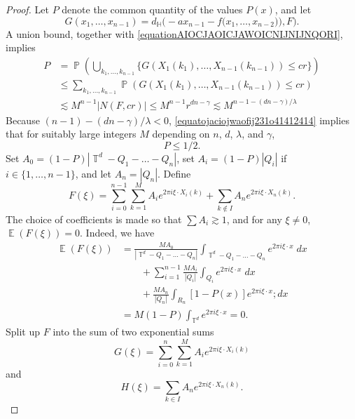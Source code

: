 \documentclass[dvipsnames,letterpaper,12pt]{article}
\numberwithin{equation}{section}
\DeclareMathOperator{\TT}{\mathbb{T}}
\numberwithin{theorem}{section}
\DeclareMathOperator{\EE}{\mathbb{E}}
\DeclareMathOperator{\PP}{\mathbb{P}}
\begin{document}
\begin{proof}
    Let $P$ denote the common quantity of the values $P(x)$, and let
    \[ G(x_1,\dots,x_{n-1}) = d_{\mathbb{H}} \Big( - a x_{n-1} - f \big( x_1, \dots, x_{n-2}) \big), F \Big). \]
    A union bound, together with \eqref{equationAIOCJAOICJAWOICNIJNIJNQORI}, implies
    \begin{equation} \label{equatojaciojwaofij231o41412414}
    \begin{split}
        P &= \PP \left( \bigcup_{k_1,\dots,k_{n-1}} \Big\{ G(X_1(k_1),\dots, X_{n-1}(k_{n-1})) \leq cr \Big\} \right)\\
        &\leq \sum_{k_1,\dots,k_{n-1}} \PP \left( G(X_1(k_1), \dots, X_{n-1}(k_{n-1})) \leq cr \right) \\
        &\lesssim M^{n-1} |N(F,cr)| \leq M^{n-1} r^{dn-\gamma} \lesssim M^{n - 1 - (dn - \gamma)/\lambda}
    \end{split}
    \end{equation}
    Because $(n-1) - (dn - \gamma)/\lambda < 0$, \eqref{equatojaciojwaofij231o41412414} implies that for suitably large integers $M$ depending on $n$, $d$, $\lambda$, and $\gamma$,
    \begin{equation}
        P \leq 1/2.
    \end{equation}
    Set $A_0 = (1 - P) |\TT^d - Q_1 - \dots - Q_n|$, set $A_i = (1 - P) |Q_i|$ if $i \in \{ 1, \dots, n - 1 \}$, and let $A_n = |Q_n|$. Define
    \[ F(\xi) = \sum_{i = 0}^{n-1} \sum_{k = 1}^M A_i e^{2 \pi i \xi \cdot X_i(k)} + \sum_{k \not \in I} A_n e^{2 \pi i \xi \cdot X_n(k)}. \]
    The choice of coefficients is made so that $\sum A_i \gtrsim 1$, and for any $\xi \neq 0$, $\EE(F(\xi)) = 0$. Indeed, we have
    \begin{align*}
        \EE(F(\xi)) &= \frac{M A_0}{|\TT^d - Q_1 - \dots - Q_n|} \int_{\TT^d - Q_1 - \dots - Q_n} e^{2 \pi i \xi \cdot x}\; dx\\
        &\quad\quad + \sum_{i = 1}^{n-1} \frac{M A_i}{|Q_i|} \int_{Q_i} e^{2 \pi i \xi \cdot x}\; dx\\
        &\quad\quad + \frac{M A_n}{|Q_n|} \int_{R_n} [1 - P(x)] e^{2 \pi i \xi \cdot x}; dx\\
        &= M (1 - P) \int_{\TT^d} e^{2 \pi i \xi \cdot x} = 0.
    \end{align*}
    Split up $F$ into the sum of two exponential sums
    \[ G(\xi) = \sum_{i = 0}^n \sum_{k = 1}^M A_i e^{2 \pi i \xi \cdot X_i(k)} \]
    and
    \[ H(\xi) = \sum_{k \in I} A_n e^{2 \pi i \xi \cdot X_n(k)}. \]

\end{proof}
\end{document}
